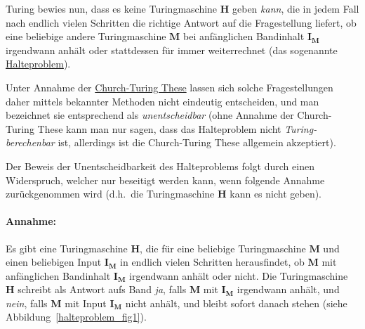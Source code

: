 Turing bewies nun, dass es keine Turingmaschine $\mathbf{H}$ geben \emph{kann}, die in jedem Fall nach endlich vielen Schritten die richtige Antwort auf die Fragestellung liefert, ob eine beliebige andere Turingmaschine $\mathbf{M}$ bei anfänglichen Bandinhalt $\mathbf{I_M}$ irgendwann anhält oder stattdessen für immer weiterrechnet (das sogenannte \href{http://de.wikipedia.org/wiki/Halteproblem}{Halteproblem}). 

Unter Annahme der \href{http://de.wikipedia.org/wiki/Church-Turing-These}{Church-Turing These} lassen sich solche Fragestellungen daher mittels bekannter Methoden nicht eindeutig entscheiden, und man bezeichnet sie entsprechend als \emph{unentscheidbar} (ohne Annahme der Church-Turing These kann man nur sagen, dass das Halteproblem nicht \emph{Turing-berechenbar} ist, allerdings ist die Church-Turing These allgemein akzeptiert). 

Der Beweis der Unentscheidbarkeit des Halteproblems folgt durch einen Widerspruch, welcher nur beseitigt werden kann, wenn folgende Annahme zurückgenommen wird (d.h.\ die Turingmaschine $\mathbf{H}$ kann es nicht geben).

\paragraph{Annahme:} Es gibt eine Turingmaschine $\mathbf{H}$, die für eine beliebige Turingmaschine $\mathbf{M}$ und einen beliebigen Input $\mathbf{I_M}$ in endlich vielen Schritten herausfindet, ob $\mathbf{M}$ mit anfänglichen Bandinhalt $\mathbf{I_M}$ irgendwann anhält oder nicht. Die Turingmaschine $\mathbf{H}$ schreibt als Antwort aufs Band \emph{ja}, falls $\mathbf{M}$ mit $\mathbf{I_M}$ irgendwann anhält, und \emph{nein}, falls $\mathbf{M}$ mit Input $\mathbf{I_M}$ nicht anhält, und bleibt sofort danach stehen (siehe Abbildung~\ref{halteproblem_fig1}).

